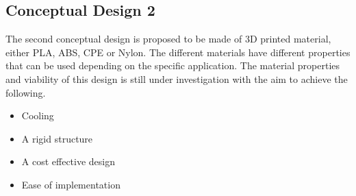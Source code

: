 \subsection{Conceptual Design 2}
The second conceptual design is proposed to be made of 3D printed material, either PLA, ABS, CPE or Nylon. The different materials have different properties that can be used depending on the specific application. The material properties and viability of this design is still under investigation with the aim to achieve the following.
\begin{itemize}
	\item Cooling
	\item A rigid structure
	\item A cost effective design
	\item Ease of implementation
\end{itemize}
